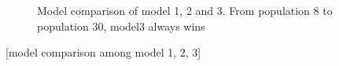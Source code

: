 \begin{figure}
    \begin{center}
    \end{center}

    \caption[Estimated posterior distribution of parameters in model 3]%
    {Estimated posterior distribution of parameters in model 3. Shaded range indicates 25\%--75\% quantile of the population}
    \label{fig:para1}

    \begin{center}
    \end{center}

    \caption[Model comparison of model 1, 2 and 3]%
    {Model comparison of model 1, 2 and 3. From population 8 to population 30, model3 always wins}
    \label{fig:cmp1}

\end{figure}

[model comparison among model 1, 2, 3]

